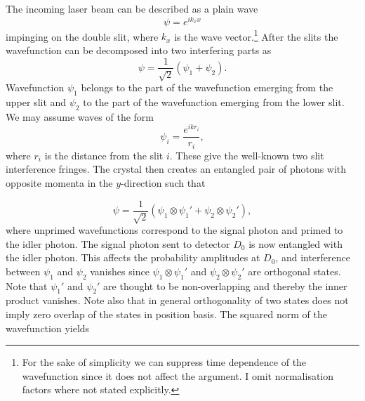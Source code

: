 \documentclass[12pt]{article}
\numberwithin{equation}{section}
\begin{document}
The incoming laser beam can be described as a plain wave 
\begin{equation}
\label{laser}
\psi=e^{ik_xx}
\end{equation} impinging on the double slit, where $k_x$ is the wave vector.\footnote{For the sake of simplicity we can suppress time dependence of the wavefunction since it does not affect the argument. I omit normalisation factors where not stated explicitly.} After the slits the wavefunction can be decomposed into two interfering parts as
\begin{equation}
\psi= \frac{1}{\sqrt{2}}(\psi_1+\psi_2).
\end{equation} Wavefunction $\psi_1$ belongs to the part of the wavefunction emerging from the upper slit and $\psi_2$ to the part of the wavefunction emerging from the lower slit. We may assume waves of the form
\begin{equation}
\psi_i=\frac{e^{ikr_i}}{r_i},
\end{equation} where $r_i$ is the distance from the slit $i$. 
These give the well-known two slit interference fringes. The crystal then creates an entangled pair of photons with opposite momenta in the $y$-direction such that 

\begin{equation}
\label{pair}
\psi=\frac{1}{\sqrt{2}}(\psi_1\otimes \psi_1'+\psi_2\otimes \psi_2'),
\end{equation} where unprimed wavefunctions correspond to the signal photon and primed to the idler photon. The signal photon sent to detector $D_0$ is now entangled with the idler photon. This affects the probability amplitudes at $D_0$, and interference between $\psi_1$ and $\psi_2$ vanishes since $\psi_1\otimes \psi_1'$ and  $\psi_2\otimes \psi_2'$ are orthogonal states. Note that $\psi_1'$ and $\psi_2'$ are thought to be non-overlapping and thereby the inner product vanishes. Note also that in general orthogonality of two states does not imply zero overlap of the states in position basis. The squared norm of the wavefunction yields
\end{document}
